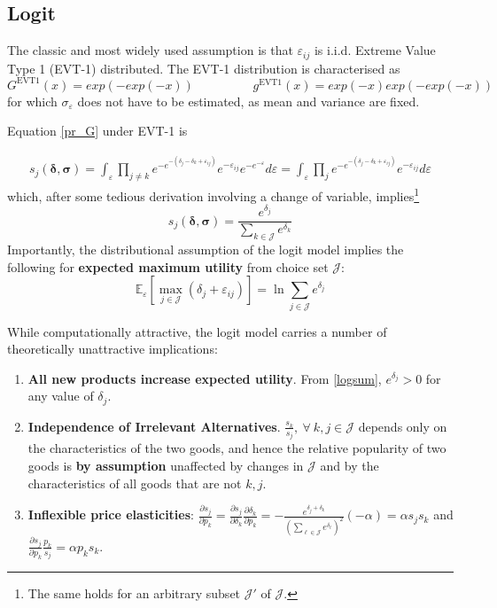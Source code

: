 \documentclass[11pt]{article}
\begin{document}
\subsection{Logit}

The classic and most widely used assumption is that $\varepsilon_{ij}$ is i.i.d. Extreme Value Type 1 (EVT-1) distributed.
The EVT-1 distribution is characterised as
\begin{equation*}
		G^{\text{EVT1}}(x) = exp(-exp(-x)) \hspace{2cm} g^{\text{EVT1}}(x) = exp(-x) exp(-exp(-x))
\end{equation*}
for which $\sigma_\varepsilon$ does not have to be estimated, as mean and variance are fixed.

Equation \eqref{pr_G} under EVT-1 is

\begin{equation*}
	\begin{gathered}
	s_j(\bm{\delta, \sigma}) =	\int_\varepsilon \prod_{j \neq k} e^{-e^{-(\delta_{j} - \delta_k + \varepsilon_{ij})}} e^{-\varepsilon_{ij}} e^{-e^{-\varepsilon}} d\varepsilon = \int_\varepsilon \prod_{j} e^{-e^{-(\delta_{j} - \delta_k + \varepsilon_{ij})}} e^{-\varepsilon_{ij}} d\varepsilon
	\end{gathered}
\end{equation*}
which, after some tedious derivation involving a change of variable, implies\footnote{The same holds for an arbitrary subset $\mathscr{J}'$ of $\mathscr{J}$.}
\begin{equation}
	s_j(\bm{\delta, \sigma}) = \frac{e^{\delta_j}}{\sum_{k \in \mathscr{J}} e^{\delta_k} }
\end{equation}
Importantly, the distributional assumption of the logit model implies the following for \textbf{expected maximum utility} from choice set $\mathscr{J}$:
\begin{equation}
	\label{logsum}
	\mathbb{E}_\varepsilon [\max_{j \in \mathscr{J}}(\delta_j + \varepsilon_{ij})] = \ln \sum_{j \in \mathscr{J}} e^{\delta_j}
\end{equation}

While computationally attractive, the logit model carries a number of theoretically unattractive implications:
\begin{enumerate}
	\item \textbf{All new products increase expected utility}. From \eqref{logsum}, $e^{\delta_j} > 0 $ for any value of $\delta_j$.
	\item \textbf{Independence of Irrelevant Alternatives}. $\frac{s_k}{s_j}, ~\forall~ k,j \in \mathscr{J}$ depends only on the characteristics of the two goods, and hence the relative popularity of two goods is \textbf{by assumption} unaffected by changes in $\mathscr{J}$ and by the characteristics of all goods that are not $k, j$.
	\item \textbf{Inflexible price elasticities}: $\frac{\partial s_j}{\partial p_k} = \frac{\partial s_j}{\partial \delta_k}\frac{\partial \delta_k}{\partial p_k} = - \frac{e^{\delta_j + \delta_k}}{(\sum_{\ell \in \mathscr{J}} e^{\delta_\ell})^2}(-\alpha) = \alpha s_j s_k$
	and $\frac{\partial s_j}{\partial p_k} \frac{p_k}{s_j} = \alpha p_k s_k$.
\end{enumerate}
\end{document}
